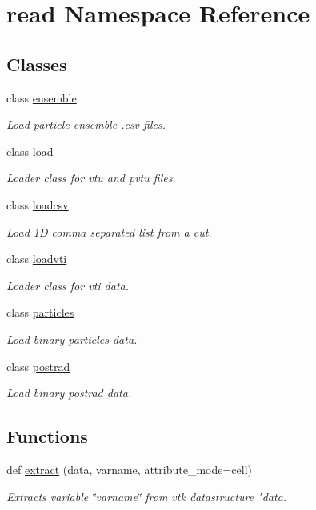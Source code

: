 \hypertarget{namespaceread}{}\section{read Namespace Reference}
\label{namespaceread}
\subsection*{Classes}
\begin{DoxyCompactItemize}
\item 
class \hyperlink{classread_1_1ensemble}{ensemble}
\begin{DoxyCompactList}\small\item\em Load particle ensemble .csv files. \end{DoxyCompactList}\item 
class \hyperlink{classread_1_1load}{load}
\begin{DoxyCompactList}\small\item\em Loader class for vtu and pvtu files. \end{DoxyCompactList}\item 
class \hyperlink{classread_1_1loadcsv}{loadcsv}
\begin{DoxyCompactList}\small\item\em Load 1D comma separated list from a cut. \end{DoxyCompactList}\item 
class \hyperlink{classread_1_1loadvti}{loadvti}
\begin{DoxyCompactList}\small\item\em Loader class for vti data. \end{DoxyCompactList}\item 
class \hyperlink{classread_1_1particles}{particles}
\begin{DoxyCompactList}\small\item\em Load binary particles data. \end{DoxyCompactList}\item 
class \hyperlink{classread_1_1postrad}{postrad}
\begin{DoxyCompactList}\small\item\em Load binary postrad data. \end{DoxyCompactList}\end{DoxyCompactItemize}
\subsection*{Functions}
\begin{DoxyCompactItemize}
\item 
def \hyperlink{namespaceread_a565fbd6a03d2869132df93c79903a6d4}{extract} (data, varname, attribute\+\_\+mode=\textquotesingle{}cell\textquotesingle{})
\begin{DoxyCompactList}\small\item\em Extracts variable \char`\"{}varname\char`\"{} from vtk datastructure "data\textquotesingle{}. \end{DoxyCompactList}\end{DoxyCompactItemize}
